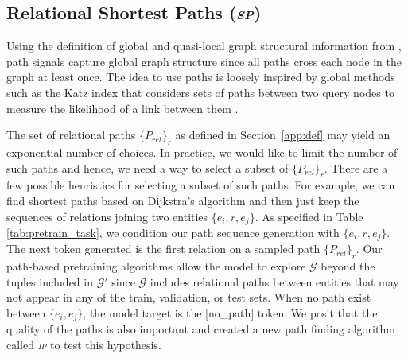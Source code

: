 \documentclass{article}
\newcommand{\spa}{\textsl{\textsc{sp}}\xspace}
\newcommand{\ipa}{\textsl{\textsc{ip}}\xspace}
\newcommand{\mask}{\mbox{\texttt{[mask]}}}
\newcommand{\nopath}{\mbox{[no\_path]}}
\newcommand{\set}[1]{\ensuremath{\mathcal{#1}}}
\newcommand{\kg}[0]{{\set{G}}}
\begin{document}




\subsection{Relational Shortest Paths (\spa)}
\label{sec:shortest_path}


Using the definition of global and quasi-local graph structural information from \cite{Benhidour2022AnAF}, path signals capture global graph structure since all paths cross each node in the graph at least once. 
The idea to use paths is loosely inspired by global methods such as the Katz index that considers sets of paths between two query nodes to measure the likelihood of a link between them \cite{Katz1953ANS}.

The set of relational paths $\{P_{rel}\}_{r}$ as defined in Section~\ref{app:def} may yield an exponential number of choices. 
In practice, we would like to limit the number of such paths and hence, we need a way to select a subset of $\{P_{rel}\}_{r}$.
There are a few possible heuristics for selecting a subset of such paths. 
For example, we can find shortest paths based on Dijkstra's algorithm and then just keep the sequences of relations joining two entities $\{e_i, r, e_j\}$. 
As specified in Table \ref{tab:pretrain_task}, we condition our path sequence generation with $\{e_i, r, e_j\}$.
The next token generated is the first relation on a sampled path $\{P_{rel}\}_{r}$.
Our path-based pretraining algorithms allow the model to explore $\kg$ beyond the tuples included in $\mathcal{G'}$ since $\kg$ includes relational paths between entities that may not appear in any of the train, validation, or test sets.
When no path exist between $\{e_i,e_j\}$, the model target is the \nopath{} token.
We posit that the quality of the paths is also important and created a new path finding algorithm called \ipa to test this hypothesis.
\end{document}
